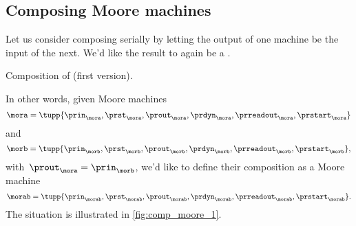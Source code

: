
\subsection{Composing Moore machines}

Let us consider composing  serially by letting the output of one machine be the input of the next.
We'd like the result to again be a .

\begin{marginfigure}
    \centering
    \caption{Composition of  (first version).}
    \label{fig:comp_moore_1}
\end{marginfigure}

In other words, given Moore machines
%
\begin{equation}
    \label{eq:moore-mora}
    \mora = \tupp{\prin_{\mora},\prst_{\mora},\prout_{\mora},\prdyn_{\mora},\prreadout_{\mora},\prstart_{\mora}}
\end{equation}
%
and
%
\begin{equation}
    \label{eq:moore-morb}
    \morb = \tupp{\prin_{\morb},\prst_{\morb},\prout_{\morb},\prdyn_{\morb},\prreadout_{\morb},\prstart_{\morb}},
\end{equation}
with~$\prout_{\mora} = \prin_{\morb}$, we'd like to define their composition as a Moore machine
\begin{equation}
    \label{eq:moore-morab-comp}
    \morab = \tupp{\prin_{\morab},\prst_{\morab},\prout_{\morab},\prdyn_{\morab},\prreadout_{\morab},\prstart_{\morab}}.
\end{equation}
The situation is illustrated in \cref{fig:comp_moore_1}.


